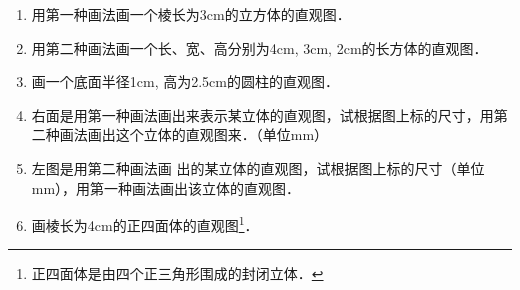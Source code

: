 \begin{ex}
\begin{enumerate}
    \item 用第一种画法画一个棱长为3cm的立方体的直观图．
    \item 用第二种画法画一个长、宽、高分别为4cm, 3cm, 2cm的长方体的直观图．
    \item 画一个底面半径1cm, 高为2.5cm的圆柱的直观图．
    \item 右面是用第一种画法画出来表示某立体的直观图，试根据图上标的尺寸，用第二种画法画出这个立体的直观图来．（单位mm）
    \item 左图是用第二种画法画
    出的某立体的直观图，试根据图上标的尺寸（单位mm），用第一种画法画出该立体的直观图．
    \item 画棱长为4cm的正四面体的直观图\footnote{正四面体是由四个正三角形围成的封闭立体．}．
\end{enumerate}
\end{ex}



